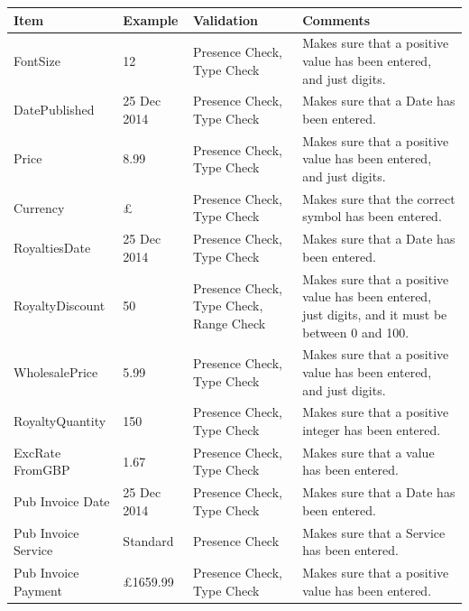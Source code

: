 \begin{center}
    \begin{tabular}{|p{2.5cm}|p{2cm}|p{2cm}|p{3cm}|}
    \hline
    \textbf{Item} & \textbf{Example} & \textbf{Validation} & \textbf{Comments}\\ \hline
    FontSize & 12 & Presence Check, Type Check & Makes sure that a positive value has been entered, and just digits. \\ \hline
    DatePublished & 25 Dec 2014 & Presence Check, Type Check & Makes sure that a Date has been entered. \\ \hline
    Price & 8.99 & Presence Check, Type Check & Makes sure that a positive value has been entered, and just digits. \\ \hline
    Currency & £ & Presence Check, Type Check & Makes sure that the correct symbol has been entered. \\ \hline
    RoyaltiesDate & 25 Dec 2014 & Presence Check, Type Check & Makes sure that a Date has been entered. \\ \hline
    RoyaltyDiscount & 50 & Presence Check, Type Check, Range Check & Makes sure that a positive value has been entered, just digits, and it must be between 0 and 100. \\ \hline
    WholesalePrice & 5.99 & Presence Check, Type Check & Makes sure that a positive value has been entered, and just digits. \\ \hline
    RoyaltyQuantity & 150 & Presence Check, Type Check & Makes sure that a positive integer has been entered. \\ \hline
    ExcRate FromGBP & 1.67 & Presence Check, Type Check & Makes sure that a value has been entered. \\ \hline
    Pub Invoice Date & 25 Dec 2014 & Presence Check, Type Check & Makes sure that a Date has been entered. \\ \hline
    Pub Invoice Service & Standard & Presence Check & Makes sure that a Service has been entered. \\ \hline
    Pub Invoice Payment & £1659.99 & Presence Check, Type Check & Makes sure that a positive value has been entered. \\ \hline
\end{tabular}
\end{center}

